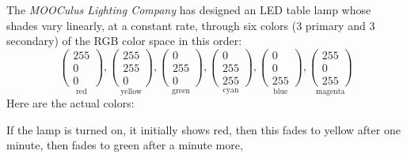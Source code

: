 \documentclass{ximera}
\begin{document}
\begin{example}
  The \textit{MOOCulus Lighting Company} has designed an LED table
  lamp whose shades vary linearly, at a constant rate, through six
  colors ($3$ primary and $3$ secondary) of the RGB color space in
  this order:
    \[
    \underset{\text{red}}{\begin{pmatrix}255\\0\\0\end{pmatrix}},
    \underset{\text{yellow}}{\begin{pmatrix}255\\255\\0\end{pmatrix}},
    \underset{\text{green}}{\begin{pmatrix}0\\255\\0\end{pmatrix}},
    \underset{\text{cyan}}{\begin{pmatrix}0\\255\\255\end{pmatrix}},
    \underset{\text{blue}}{\begin{pmatrix}0\\0\\255\end{pmatrix}},
    \underset{\text{magenta}}{\begin{pmatrix}255\\0\\255\end{pmatrix}}
    \]
    Here are the actual colors:
    \begin{center}
    \end{center}
  If the lamp is turned on, it initially shows red, then this fades to
  yellow after one minute, then fades to green after a minute more,

\end{example}
\end{document}

